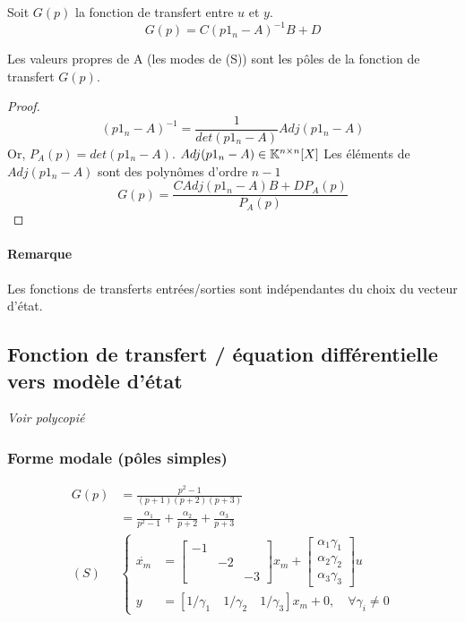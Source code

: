 \documentclass[main.tex]{subfiles}
\begin{document}
Soit $G(p)$ la fonction de transfert entre $u$ et $y$.
\[\boxed{G(p) = C(p1_n-A)^{-1}B+D}\]

\begin{prop}
Les valeurs propres de A (les modes de (S)) sont les pôles de la fonction de transfert $G(p)$.
\end{prop}

\begin{proof}
\[(p1_n-A)^{-1}=\frac{1}{det(p1_n-A)}Adj(p1_n-A)\]
Or, $P_A(p) = det(p1_n-A)$. $Adj(p1_n-A)\in\mathbb{K}^{n\times n}[X]$ Les éléments de $Adj(p1_n-A)$ sont des polynômes d'ordre $n-1$
\[G(p) = \frac{CAdj(p1_n-A)B+DP_A(p)}{P_A(p)}\]
\end{proof}

\paragraph{Remarque} Les fonctions de transferts entrées/sorties sont indépendantes du choix du vecteur d'état.


\subsection{Fonction de transfert / équation différentielle vers modèle d'état}

\emph{Voir polycopié}


\subsubsection*{Forme modale (pôles simples)}
\begin{align*}
G(p) & = \frac{p^2-1}{(p+1)(p+2)(p+3)}\\
& = \frac{\alpha_1}{p^2-1} + \frac{\alpha_2}{p+2} + \frac{\alpha_3}{p+3} \\
(S) & \left\{ \begin{array}{cc}
\dot{x_m} & = \left[\begin{array}{ccc}
-1 & & \\
& -2 & \\
&  & -3
\end{array} \right] x_m +
\left[\begin{array}{ccc}
\alpha_1 \gamma_1 \\
\alpha_2 \gamma_2 \\
\alpha_3 \gamma_3
\end{array} \right] u \\
y & = [1/\gamma_1 \quad 1/\gamma_2 \quad 1/\gamma_3]x_m+0, \quad \forall \gamma_i \neq 0
\end{array}
\right.
\end{align*}
\end{document}
